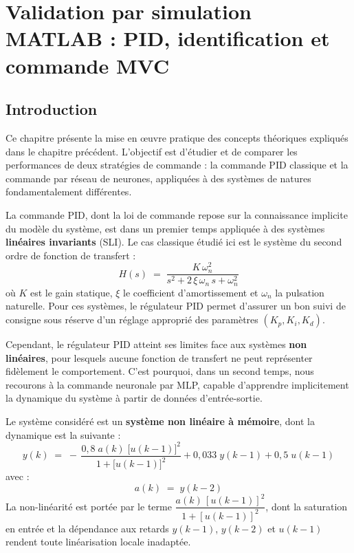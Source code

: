 \chapter{Validation par simulation MATLAB : PID, identification et commande MVC}

\section*{Introduction}

Ce chapitre présente la mise en œuvre pratique des concepts théoriques expliqués dans le chapitre précédent. L'objectif est d'étudier et de comparer les performances de deux stratégies de commande : la commande PID classique et la commande par réseau de neurones, appliquées à des systèmes de natures fondamentalement différentes.

La commande PID, dont la loi de commande repose sur la connaissance implicite du modèle du système, est dans un premier temps appliquée à des systèmes \textbf{linéaires invariants} (SLI). Le cas classique étudié ici est le système du second ordre de fonction de transfert :
\begin{equation}
	H(s) \;=\;
	\frac{K\,\omega_n^2}{s^2 + 2\,\xi\,\omega_n\,s + \omega_n^2}
	\label{eq:sys_second_ordre}
\end{equation}
où $K$ est le gain statique, $\xi$ le coefficient d'amortissement et $\omega_n$ la pulsation naturelle. Pour ces systèmes, le régulateur PID permet d'assurer un bon suivi de consigne sous réserve d'un réglage approprié des paramètres $(K_p, K_i, K_d)$.

Cependant, le régulateur PID atteint ses limites face aux systèmes \textbf{non linéaires}, pour lesquels aucune fonction de transfert ne peut représenter fidèlement le comportement. C'est pourquoi, dans un second temps, nous recourons à la commande neuronale par MLP, capable d'apprendre implicitement la dynamique du système à partir de données d'entrée-sortie.

Le système considéré est un \textbf{système non linéaire à mémoire}, dont la dynamique est la suivante :
\begin{equation}
	y(k) \;=\;
	-\,\frac{0{,}8\;a(k)\;\bigl[u(k-1)\bigr]^2}
	{1 + \bigl[u(k-1)\bigr]^2}
	+ 0{,}033\;y(k-1)
	+ 0{,}5\;u(k-1)
	\label{eq:sys_nl2_y}
\end{equation}
avec :
\[
a(k) \;=\; y(k-2)
\label{eq:sys_nl2_a}
\]
La non-linéarité est portée par le terme $\dfrac{a(k)\,[u(k-1)]^2}{1+[u(k-1)]^2}$, dont la saturation en entrée et la dépendance aux retards $y(k-1)$, $y(k-2)$ et $u(k-1)$ rendent toute linéarisation locale inadaptée.

